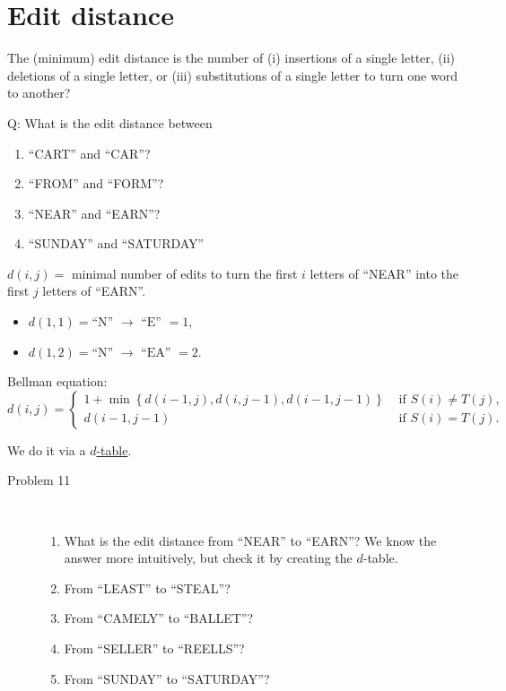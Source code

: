 \documentclass[a4paper, 12pt]{article}
\begin{document}
\newpage
\clearpage

\section{Edit distance}

The (minimum) edit distance is the number of (i) insertions of a single letter, (ii) deletions of a single letter, or (iii) substitutions of a single letter to turn one word to another?

\bigskip

Q: What is the edit distance between
\begin{enumerate}
\item ``CART'' and ``CAR''?
\item ``FROM'' and ``FORM''?
\item ``NEAR'' and ``EARN''?
\item ``SUNDAY'' and ``SATURDAY''
\end{enumerate}

$d(i, j) =$ minimal number of edits to turn the first $i$ letters of ``NEAR'' into the first $j$ letters of ``EARN''.
\begin{itemize}
\item $d(1, 1) = \text{``N'' } \to \text{ ``E'' } = 1$,
\item $d(1, 2) = \text{``N'' } \to \text{ ``EA'' } = 2$.
\end{itemize}

Bellman equation:
\begin{equation}
d(i, j) = \begin{cases}
1 + \min \left\{ d(i-1, j), d(i, j-1), d(i-1, j-1) \right\} & \text{ if } S(i) \neq T(j),\\
d(i-1, j-1) & \text{ if } S(i) = T(j).
\end{cases}
\end{equation}

We do it via a \underline{$d$-table}.

\begin{description}

\item [Problem 11]  \ 

\begin{enumerate}
\item What is the edit distance from ``NEAR'' to ``EARN''? We know the answer more intuitively, but check it by creating the $d$-table.
\item From ``LEAST'' to ``STEAL''?
\item From ``CAMELY'' to ``BALLET''?
\item From ``SELLER'' to ``REELLS''?
\item From ``SUNDAY'' to ``SATURDAY''?
\end{enumerate}

\end{description}
\end{document}
